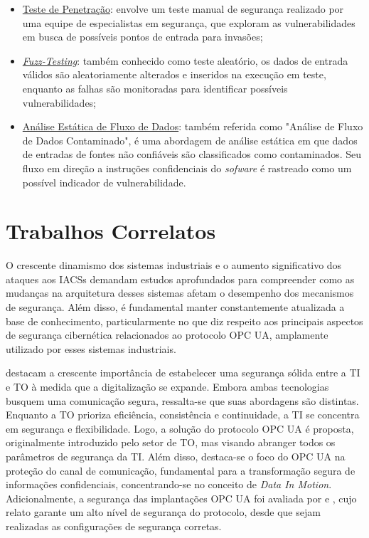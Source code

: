     \begin{itemize}
        \item \underline{Teste de Penetração}: envolve um teste manual de segurança realizado por uma equipe de especialistas em segurança, que exploram as vulnerabilidades em busca de possíveis pontos de entrada para invasões;
        \item \underline{\textit{Fuzz-Testing}}: também conhecido como teste aleatório, os dados de entrada válidos são aleatoriamente alterados e inseridos na execução em teste, enquanto as falhas são monitoradas para identificar possíveis vulnerabilidades;
        \item \underline{Análise Estática de Fluxo de Dados}: também referida como "Análise de Fluxo de Dados Contaminado", é uma abordagem de análise estática em que dados de entradas de fontes não confiáveis são classificados como contaminados. Seu fluxo em direção a instruções confidenciais do \textit{sofware} é rastreado como um possível indicador de vulnerabilidade.
    \end{itemize}
    
    \section{Trabalhos Correlatos} \label{sec:trabCorrelatos}

    O crescente dinamismo dos sistemas industriais e o aumento significativo dos ataques aos IACSs demandam estudos aprofundados para compreender como as mudanças na arquitetura desses sistemas afetam o desempenho dos mecanismos de segurança. Além disso, é fundamental manter constantemente atualizada a base de conhecimento, particularmente no que diz respeito aos principais aspectos de segurança cibernética relacionados ao protocolo OPC UA, amplamente utilizado por esses sistemas industriais.

     destacam a crescente importância de estabelecer uma segurança sólida entre a TI e TO à medida que a digitalização se expande. Embora ambas tecnologias busquem uma comunicação segura, ressalta-se que suas abordagens são distintas. Enquanto a TO prioriza eficiência, consistência e continuidade, a TI se concentra em segurança e flexibilidade. Logo, a solução do protocolo OPC UA é proposta, originalmente introduzido pelo setor de TO, mas visando abranger todos os parâmetros de segurança da TI. Além disso, destaca-se o foco do OPC UA na proteção do canal de comunicação, fundamental para a transformação segura de informações confidenciais, concentrando-se no conceito de \textit{Data In Motion}. Adicionalmente, a segurança das implantações OPC UA foi avaliada por  e , cujo relato garante um alto nível de segurança do protocolo, desde que sejam realizadas as configurações de segurança corretas.

